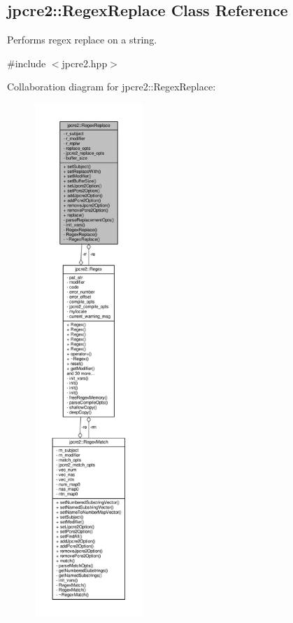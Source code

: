 \hypertarget{classjpcre2_1_1RegexReplace}{}\subsection{jpcre2\+:\+:Regex\+Replace Class Reference}
\label{classjpcre2_1_1RegexReplace}


Performs regex replace on a string.  




{\ttfamily \#include $<$jpcre2.\+hpp$>$}



Collaboration diagram for jpcre2\+:\+:Regex\+Replace\+:
\nopagebreak
\begin{figure}[H]
\begin{center}
\leavevmode
\includegraphics[height=550pt]{classjpcre2_1_1RegexReplace__coll__graph}
\end{center}
\end{figure}
